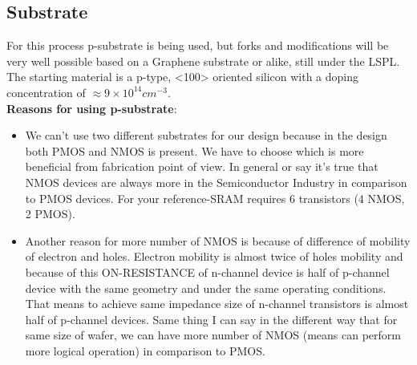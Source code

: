 \subsection{Substrate}
For this process p-substrate is being used, but forks and modifications will be very well possible based on a Graphene substrate or alike, still under the LSPL.
The starting material is a p-type, <100> oriented silicon with a doping concentration of $\approx 9\times10^{14}cm^{-3}$.\\

\textbf{Reasons for using p-substrate}:\begin{itemize}
\item We can't use two different substrates for our design because in the design both PMOS and NMOS is present.
We have to choose which is more beneficial from fabrication point of view.
In general or say it's true that NMOS devices are always more in the Semiconductor Industry in comparison to PMOS devices.
For your reference-SRAM requires 6 transistors (4 NMOS, 2 PMOS).
\item Another reason for more number of NMOS is because of difference of mobility of electron and holes.
Electron mobility is almost twice of holes mobility and because of this ON-RESISTANCE of n-channel device is half of p-channel device with the same geometry and under the same operating conditions.
That means to achieve same impedance size of n-channel transistors is almost half of p-channel devices.
Same thing I can say in the different way that for same size of wafer, we can have more number of NMOS (means can perform more logical operation) in comparison to PMOS.
\end{itemize}